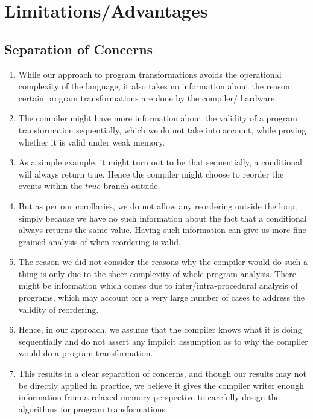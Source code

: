 \section{Limitations/Advantages}

    \subsection{Separation of Concerns}
    \begin{enumerate}
        \item While our approach to program transformations avoids the operational complexity of the language, it also takes no information about the reason certain program transformations are done by the compiler/ hardware. 
        \item The compiler might have more information about the validity of a program transformation sequentially, which we do not take into account, while proving whether it is valid under weak memory. 
        \item As a simple example, it might turn out to be that sequentially, a conditional will always return true. Hence the compiler might choose to reorder the events within the $true$ branch outside. 
        \item But as per our corollaries, we do not allow any reordering outside the loop, simply because we have no such information about the fact that a conditional always returns the same value. Having such information can give us more fine grained analysis of when reordering is valid. 
        \item The reason we did not consider the reasons why the compiler would do such a thing is only due to the sheer complexity of whole program analysis. There might be information which comes due to inter/intra-procedural analysis of programs, which may account for a very large number of cases to address the validity of reordering. 
        \item Hence, in our approach, we assume that the compiler knows what it is doing sequentially and do not assert any implicit assumption as to why the compiler would do a program transformation. 
        \item This results in a clear separation of concerns, and though our results may not be directly applied in practice, we believe it gives the compiler writer enough information from a relaxed memory perspective to carefully design the algorithms for program transformations.  
    \end{enumerate}

